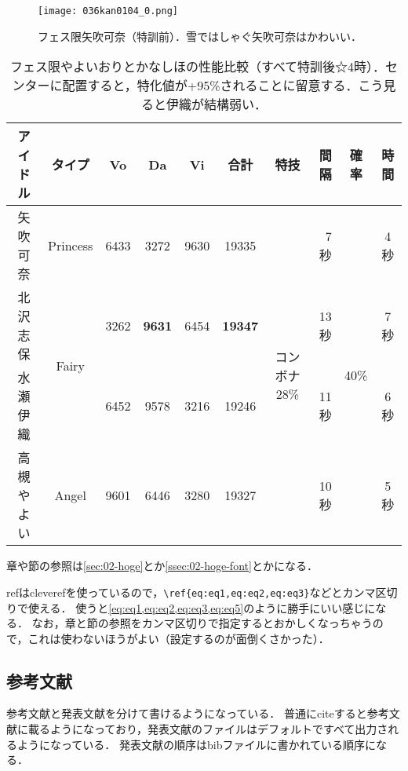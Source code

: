 \begin{figure}
    \centering
    \texttt{[image: 036kan0104\_0.png]}
    \caption[フェス限矢吹可奈]{フェス限矢吹可奈（特訓前）．雪ではしゃぐ矢吹可奈はかわいい．}
    \label{fig:kana}
\end{figure}

\begin{table}
    \centering
    \caption[フェス限やよいおりとかなしほの性能比較]{フェス限やよいおりとかなしほの性能比較（すべて特訓後☆4時）．センターに配置すると，特化値が+95\%されることに留意する．こう見ると伊織が結構弱い．}
    \begin{tabular}{cc|cccc|crcc}
        \toprule
        アイドル & タイプ & Vo & Da  & Vi & 合計 & 特技 & 間隔 & 確率 & 時間 \\ \hline\hline
        矢吹可奈 & Princess & 6433 & 3272 & 9630 & 19335 & \multirow{4}{*}{コンボナ28\%} & 7秒 & \multirow{4}{*}{40\%} & 4秒 \\\cline{1-6}\cline{8-8}\cline{10-10}
        北沢志保 & \multirow{2}{*}{Fairy} & 3262 & \textbf{9631} & 6454 & \textbf{19347} & & 13秒 & & 7秒 \\\cline{1-1}\cline{3-6}\cline{8-8}\cline{10-10}
        水瀬伊織 &  & 6452 & 9578 & 3216 & 19246 & & 11秒 & & 6秒 \\\cline{1-6}\cline{8-8}\cline{10-10}
        高槻やよい & Angel & 9601 & 6446 & 3280 & 19327 & & 10秒 & & 5秒\\
        \bottomrule
    \end{tabular}
    \label{tbl:fes}
\end{table}

章や節の参照は\ref{sec:02-hoge}とか\ref{ssec:02-hoge-font}とかになる．

refはcleverefを使っているので，\verb|\ref{eq:eq1,eq:eq2,eq:eq3}|などとカンマ区切りで使える．
使うと\ref{eq:eq1,eq:eq2,eq:eq3,eq:eq5}のように勝手にいい感じになる．
なお，章と節の参照をカンマ区切りで指定するとおかしくなっちゃうので，これは使わないほうがよい（設定するのが面倒くさかった）．

\subsection{参考文献}

参考文献と発表文献を分けて書けるようになっている．
普通にciteすると参考文献に載るようになっており，発表文献のファイルはデフォルトですべて出力されるようになっている．
発表文献の順序はbibファイルに書かれている順序になる．

